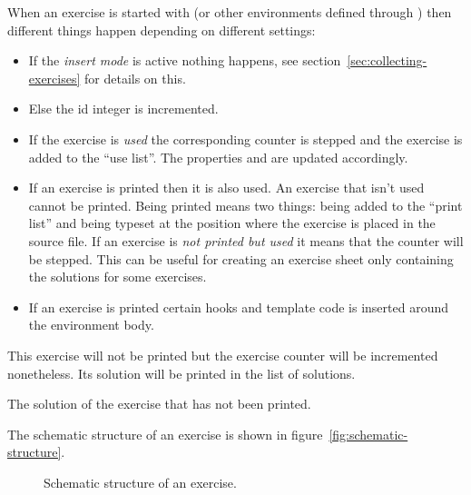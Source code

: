 \documentclass[load-preamble+]{cnltx-doc}
\newcommand\environ[1]{\beginenv*\Marg{\env{exercise}}}
\begin{document}
When an exercise is started with \environ{exercise} (or other environments
defined through ) then different things happen
depending on different settings:
\begin{itemize}
  \item If the \emph{insert mode} is active nothing happens, see
    section~\vref{sec:collecting-exercises} for details on this.
  \item Else the id integer is incremented.
  \item If the exercise is \emph{used} the corresponding counter is stepped
    and the exercise is added to the \enquote{use list}.  The properties
     and  are updated accordingly.
  \item If an exercise is printed then it is also used. An exercise that isn't
    used cannot be printed.  Being printed means two things: being added to
    the \enquote{print list} and being typeset at the position where the
    exercise is placed in the source file.  If an exercise is \emph{not
      printed but used} it means that the counter will be stepped.  This can
    be useful for creating an exercise sheet only containing the solutions for
    some exercises.
  \item If an exercise is printed certain hooks and template code is inserted
    around the environment body.
\end{itemize}

\begin{example}[outside]
  \begin{exercise}[print=false]
    This exercise will not be printed but the exercise counter will be
    incremented nonetheless. Its solution will be printed in the list of
    solutions.
  \end{exercise}
  \begin{solution}
    The solution of the exercise that has not been printed.
  \end{solution}
\end{example}

The schematic structure of an exercise is shown in
figure~\vref{fig:schematic-structure}.

\begin{figure}
  \centering
  \caption{Schematic structure of an exercise.}\label{fig:schematic-structure} 
\end{figure}
\end{document}
